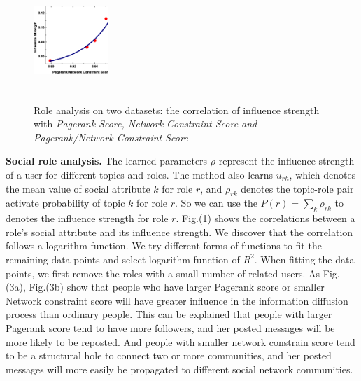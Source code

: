\documentclass[runningheads,a4paper]{llncs}
\begin{document}
\begin{figure}[htp]
{\label{fig:3b}}
\hspace{5mm}
{\includegraphics[width=0.25\textwidth,height=1.5in]{citation_PRCS.eps}
\label{fig:3b}}
\caption{Role analysis on two datasets: the correlation of influence strength with\emph{ Pagerank Score, Network Constraint Score and Pagerank/Network Constraint Score}}\label{fig3}
\end{figure}




\noindent\textbf{Social role analysis.} The learned parameters $\rho$ represent the influence strength of a user for different topics and roles. The method also learns ${u_{rh}}$, which denotes the mean value of social attribute $k$ for role $r$, and ${\rho _{rk}}$ denotes the topic-role pair activate probability of topic $k$ for role $r$. So we can use the $P({r}) = \sum\nolimits_k {{\rho _{rk}}}$ to denotes the influence strength for role $r$.
Fig.(\ref{fig3}) shows the correlations between a role's social attribute and its influence strength. We discover that the correlation follows a logarithm function. We try different forms of functions to fit the remaining data points and select logarithm function of $R^2$. When fitting the data points, we first remove the roles with a small number of related users. As Fig.(3a), Fig.(3b) show that people who have larger Pagerank score or smaller
Network constraint score will have greater influence in the information diffusion process than ordinary people. This can be explained that people with larger Pagerank score tend to have more followers, and her posted messages will be more likely to be reposted. And people with smaller network constrain score tend to be a structural hole to connect two or more communities, and her posted messages will more easily be propagated to different social network communities.
\end{document}
